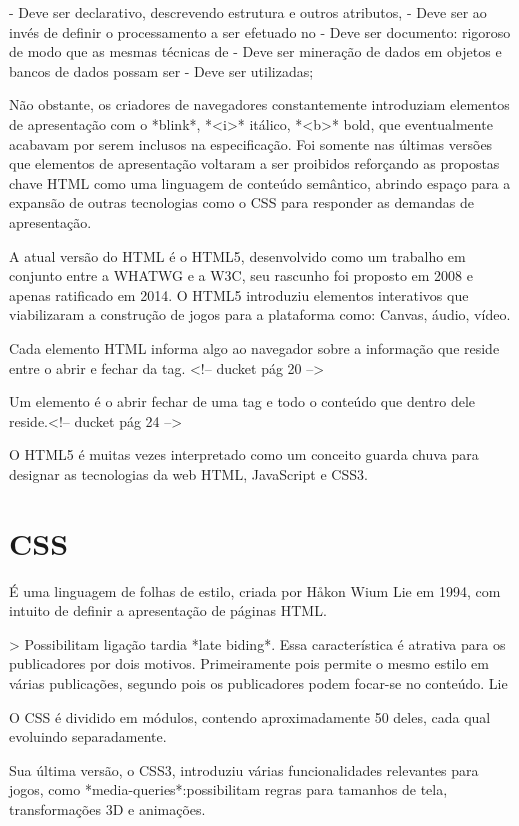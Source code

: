 \documentclass[11pt,a4paper]{article}
\begin{document}
- Deve ser declarativo, descrevendo estrutura e outros atributos,
- Deve ser ao invés de definir o processamento a ser efetuado no
- Deve ser documento: rigoroso de modo que as mesmas técnicas de
- Deve ser mineração de dados em objetos e bancos de dados possam ser
- Deve ser utilizadas;

Não obstante, os criadores de navegadores constantemente introduziam
elementos de apresentação com o *blink*, *<i>* itálico, *<b>* bold,
que eventualmente acabavam por serem inclusos na especificação. Foi
somente nas últimas versões que elementos de apresentação voltaram
a ser proibidos reforçando as propostas chave HTML como uma linguagem
de conteúdo semântico, abrindo espaço para a expansão de outras
tecnologias como o CSS para responder as demandas de apresentação.

A atual versão do HTML é o HTML5, desenvolvido como um trabalho em
conjunto entre a WHATWG e a W3C, seu rascunho foi proposto em 2008 e
apenas ratificado em 2014. O HTML5 introduziu elementos interativos que
viabilizaram a construção de jogos para a plataforma como: Canvas,
áudio, vídeo.

Cada elemento HTML informa algo ao navegador sobre a informação que
reside entre o abrir e fechar da tag. <!-- ducket pág 20 -->

Um elemento é o abrir fechar de uma tag e todo o conteúdo que dentro
dele reside.<!-- ducket pág 24 -->

O HTML5 é muitas vezes interpretado como um conceito guarda chuva para
designar as tecnologias da web HTML, JavaScript e CSS3.


\section{CSS}

É uma linguagem de folhas de estilo, criada por Håkon Wium Lie em
1994, com intuito de definir a apresentação de páginas HTML.

>  Possibilitam ligação tardia *late biding*. Essa característica
é atrativa para os publicadores por dois motivos. Primeiramente pois
permite o mesmo estilo em várias publicações, segundo pois os
publicadores podem focar-se no conteúdo. Lie

O CSS é dividido em módulos, contendo aproximadamente 50 deles, cada
qual evoluindo separadamente.

Sua última versão, o CSS3, introduziu várias funcionalidades
relevantes para jogos, como *media-queries*:possibilitam regras para
tamanhos de tela, transformações 3D e animações.
\end{document}

